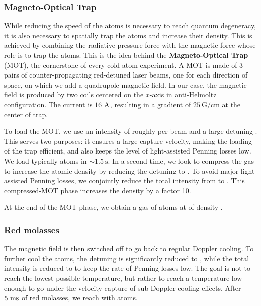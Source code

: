 \subsubsection{Magneto-Optical Trap}

While reducing the speed of the atoms is necessary to reach quantum degeneracy, it is also necessary to spatially trap the atoms and increase their density. This is achieved by combining the radiative pressure force with the magnetic force whose role is to trap the atoms. This is the idea behind the \textbf{Magneto-Optical Trap} (MOT), the cornerstone of every cold atom experiment. A MOT is made of 3 pairs of counter-propagating red-detuned laser beams, one for each direction of space, on which we add a quadrupole magnetic field. In our case, the magnetic field is produced by two coils centered on the $x$-axis in anti-Helmoltz configuration. The current is $16 \ \rm{A}$, resulting in a gradient of $25 \ \mathrm{G/cm}$ at the center of trap.

To load the MOT, we use an intensity of roughly  per beam and a large detuning . This serves two purposes: it ensures a large capture velocity, making the loading of the trap efficient, and also keeps the level of light-assisted Penning losses low. We load typically  atoms in $\sim 1.5 \ \mathrm{s}$. In a second time, we look to compress the gas to increase the atomic density by reducing the detuning to . To avoid major light-assisted Penning losses, we conjointly reduce the total intensity from  to . This compressed-MOT phase increases the density by a factor 10.

At the end of the MOT phase, we obtain a gas of  atoms at  of density .

\subsubsection{Red molasses}

The magnetic field is then switched off to go back to regular Doppler cooling. To further cool the atoms, the detuning is significantly reduced to , while the total intensity is reduced to  to keep the rate of Penning losses low. The goal is not to reach the lowest possible temperature, but rather to reach a temperature low enough to go under the velocity capture of sub-Doppler cooling effects. After $5 \ \rm{ms}$ of red molasses, we reach  with  atoms.

